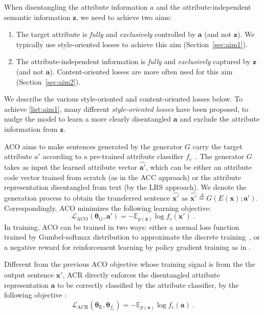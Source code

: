 \label{sec:losses}
When disentangling the attribute information $a$ and the attribute-independent semantic information $\bm{z}$, we need to achieve two aims:
\begin{enumerate}[label=Aim~\arabic*), ref=Aim~\arabic*,leftmargin=*,align=left]
    \item The target attribute is \textit{fully} and \textit{exclusively} controlled by $\bm{a}$ (and not $\bm{z}$). We typically use style-oriented losses to achieve this aim (Section~\ref{sec:aim1}). \label{list:aim1}
    \item The attribute-independent information is \textit{fully} and \textit{exclusively} captured by $\bm{z}$ (and not $\bm{a}$). Content-oriented losses are more often used for this aim (Section~\ref{sec:aim2}). \label{list:aim2}
\end{enumerate}
We describe the various style-oriented and content-oriented losses  below.
 \label{sec:aim1}
To achieve \ref{list:aim1}, many different \textit{style-oriented losses} have been proposed, to nudge the model to learn a more clearly disentangled $\bm{a}$ and exclude the attribute information from $\bm{z}$.

ACO aims to make sentences generated by the generator ${G}$ carry the target attribute $a'$ according to a pre-trained attribute classifier $f_c$~. The generator $G$ takes as input the learned attribute vector $\widehat{\bm{a}'}$, which can be either an attribute code vector trained from scratch (as in the ACC approach) or the attribute representation disentangled from text (by the LRS approach). We denote the generation process to obtain the transferred sentence $\widehat{\bm{x}'}$ as $\widehat{\bm{x}'} \overset{\Delta}{=} G(E(\bm{x}); \bm{a}')$. Correspondingly, ACO minimizes the following learning objective:
\begin{equation}
    \mathcal{L}_{\mathrm{ACO}}(\bm{\theta}_{\mathrm{G}}, \bm{a}')=-\mathbb{E}_{p(\bm{x})}\log f_c(\bm{x}')
    ~.
    \label{eq:aco}
\end{equation}
In training, ACO can be trained in two ways: either a normal loss function trained by Gumbel-softmax distribution to approximate the discrete training~,
or a negative reward for reinforcement learning by policy gradient training  as in .

Different from the previous ACO objective whose training signal is from the the output sentence $\widehat{\bm{x}'}$, ACR directly enforces the disentangled attribute representation $\bm{a}$ to be correctly classified by the attribute classifier,
by the following objective :
\begin{equation}
    \mathcal{L}_{\mathrm{ACR}}(\bm{\theta}_{\mathrm{E}},\bm{\theta}_{f_c})=-\mathbb{E}_{p(\bm{a})}\log f_c(\bm{a})~.
\end{equation}

